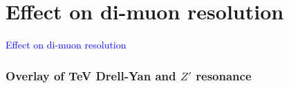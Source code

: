 \documentclass[compress]{beamer}
\begin{document}
\section*{Effect on di-muon resolution}

\begin{frame}
\begin{center}
\Huge \textcolor{blue}{Effect on di-muon resolution}
\end{center}
\end{frame}

\begin{frame}
\frametitle{Overlay of  TeV Drell-Yan and $Z'$ resonance}
\begin{columns}

\end{columns}
\end{frame}
\end{document}
